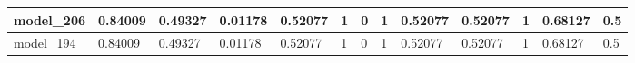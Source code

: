 \begin{tabular}{|l|l|l|l|l|l|l|l|l|l|l|l|l|}
model\_206     & 0.84009     & 0.49327        & 0.01178      & 0.52077          & 1                    & 0                    & 1            & 0.52077           & 0.52077            & 1               & 0.68127     & 0.5          \\ \hline
model\_194     & 0.84009     & 0.49327        & 0.01178      & 0.52077          & 1                    & 0                    & 1            & 0.52077           & 0.52077            & 1               & 0.68127     & 0.5          \\ \hline
\end{tabular}